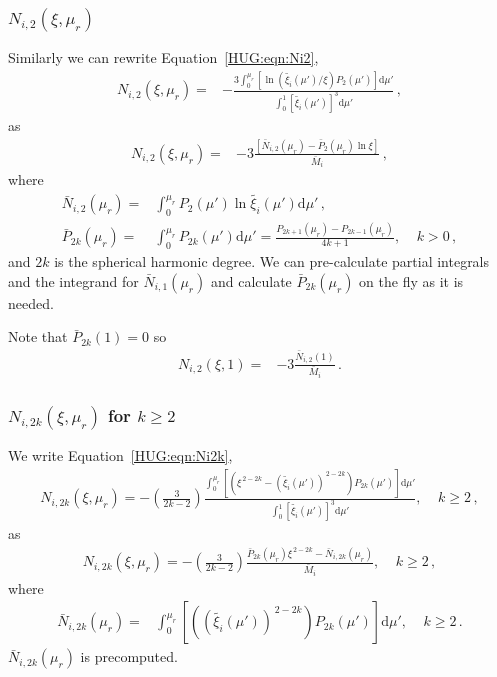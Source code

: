 \documentclass[11pt, oneside]{article}   	%
\begin{document}
\subsubsection{\boldmath$N_{i,2}(\xi,\mu_r)$}
Similarly we can rewrite Equation~\ref{HUG:eqn:Ni2},
%
\begin{align}
N_{i,2}(\xi,\mu_r) =   {} &- \frac{ 3 \int_{0}^{\mu_r} \left [ \ln \left ( \tilde{\xi_i}(\mu') / \xi \right ) P_2(\mu') \right ] \mathrm{d}\mu' }{\int_{0}^{1} \left [ \tilde{\xi_i}(\mu') \right ]^3 \mathrm{d}\mu' } \,,
\end{align}
%
as
%
\begin{align}
N_{i,2}(\xi,\mu_r) =   {} &-3 \frac{ \left [\bar{N}_{i,2}(\mu_r) -  \bar{P}_2 (\mu_r) \ln \xi  \right ]}{\bar{M}_i} \,,
\end{align}
%
where
%
\begin{align}
 \bar{N}_{i,2}(\mu_r) = {} & \int_{0}^{\mu_r} P_2(\mu')  \ln  \tilde{\xi_i}(\mu')  \mathrm{d}\mu' \,, \\
\bar{P}_{2k}(\mu_r)= {} & \int_{0}^{\mu_r} P_{2k}(\mu')\mathrm{d}\mu' = \frac{P_{2k+1}(\mu_r) - P_{2k-1}(\mu_r)}{4k+1},\; \;\;\; k>0 \,,
\end{align}
%
and $2k$ is the spherical harmonic degree. We can pre-calculate partial integrals and the integrand for $\bar{N}_{i,1}(\mu_r) $ and calculate $\bar{P}_{2k}(\mu_r)$ on the fly as it is needed.

Note that $\bar{P}_{2k}(1)=0$ so
%
\begin{align}
N_{i,2}(\xi,1) =   {} &-3 \frac{ \bar{N}_{i,2}(1)  }{\bar{M}_i} \,.
\end{align}
%

\subsubsection{\boldmath$N_{i,2k}(\xi,\mu_r)$ for  $k \ge 2 $}
We write Equation~\ref{HUG:eqn:Ni2k},
%
\begin{align}
N_{i,2k}(\xi,\mu_r) = -\left ( \frac{3}{2k-2} \right ) \frac{ \int_{0}^{\mu_r} \left [ \left ( \xi^{\, 2-2k} - (\tilde{\xi_i}(\mu'))^{\, 2-2k} \right ) P_{2k}(\mu') \right ] \mathrm{d}\mu' }{\int_{0}^{1} \left [ \tilde{\xi_i}(\mu') \right ]^3 \mathrm{d}\mu' }, \; \;\;\; k \ge 2 \,,
\end{align}
%
as
% 
\begin{align}
N_{i,2k}(\xi,\mu_r) = -\left ( \frac{3}{2k-2} \right ) \frac{  \bar{P}_{2k}(\mu_r) \xi^{\, 2-2k}  - \bar{N}_{i,2k}(\mu_r)  }{\bar{M}_i }, \; \;\;\; k \ge 2 \,,
\end{align}
%
where
%
\begin{align}
 \bar{N}_{i,2k}(\mu_r) = {} & \int_{0}^{\mu_r} \left [ \left ( (\tilde{\xi_i}(\mu'))^{\, 2-2k} \right ) P_{2k}(\mu') \right ] \mathrm{d}\mu' , \; \;\;\; k \ge 2 \,.
\end{align}
%
$\bar{N}_{i,2k}(\mu_r)$ is precomputed.
\end{document}
